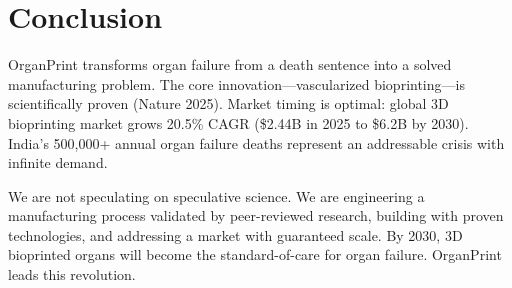 \documentclass[11pt,a4paper]{article}
\begin{document}
\section{Conclusion}

OrganPrint transforms organ failure from a death sentence into a solved manufacturing problem. The core innovation---vascularized bioprinting---is scientifically proven (Nature 2025). Market timing is optimal: global 3D bioprinting market grows 20.5\% CAGR (\$2.44B in 2025 to \$6.2B by 2030). India's 500,000+ annual organ failure deaths represent an addressable crisis with infinite demand.

We are not speculating on speculative science. We are engineering a manufacturing process validated by peer-reviewed research, building with proven technologies, and addressing a market with guaranteed scale. By 2030, 3D bioprinted organs will become the standard-of-care for organ failure. OrganPrint leads this revolution.
\end{document}
